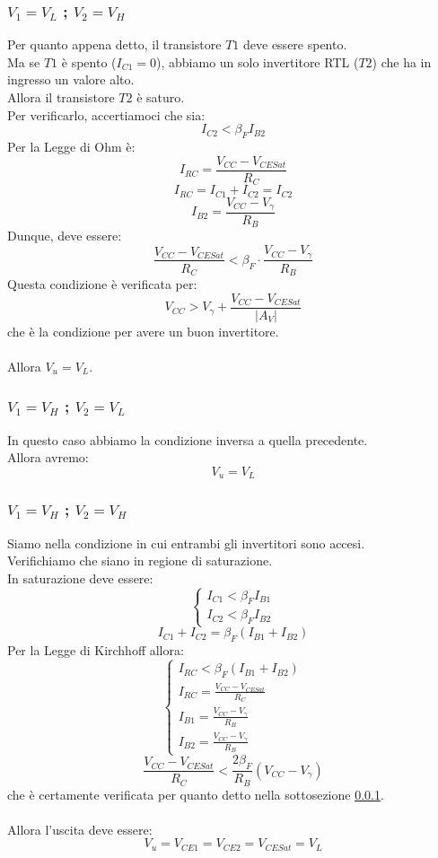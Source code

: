 \documentclass[../main.tex]{subfiles}
\begin{document}
	\subsubsection{$V_1 = V_L$  ;  $V_2 = V_H$}
	\label{subsub:gen-funz+ing-c1}
	Per quanto appena detto, il transistore $T1$ deve essere spento. \\
	Ma se $T1$ è spento ($I_{C1} = 0$), abbiamo un solo invertitore RTL ($T2$) che ha in ingresso un valore alto. \\
	Allora il transistore $T2$ è saturo. \\
	Per verificarlo, accertiamoci che sia:
	$$I_{C2} < \beta_F I_{B2}$$
	Per la Legge di Ohm è:
	$$I_{RC} = \frac{V_{CC} - V_{CESat}}{R_C}$$
	$$I_{RC} = I_{C1} + I_{C2} = I_{C2}$$
	$$I_{B2} = \frac{V_{CC} - V_\gamma}{R_B}$$
	Dunque, deve essere:
	$$\frac{V_{CC} - V_{CESat}}{R_C} < \beta_F \cdot \frac{V_{CC} - V_\gamma}{R_B}$$
	Questa condizione è verificata per:
	$$V_{CC} > V_\gamma + \frac{V_{CC} - V_{CESat}}{|A_V|}$$
	che è la condizione per avere un buon invertitore.\\\\
	Allora $V_u = V_L$.
	\subsubsection{$V_1 = V_H$  ;  $V_2 = V_L$}
	In questo caso abbiamo la condizione inversa a quella precedente. \\
	Allora avremo:
	$$V_u = V_L$$
	\subsubsection{$V_1 = V_H$  ;  $V_2 = V_H$}
	Siamo nella condizione in cui entrambi gli invertitori sono accesi. \\
	Verifichiamo che siano in regione di saturazione. \\
	In saturazione deve essere:
	$$\begin{cases} I_{C1} < \beta_F I_{B1} \\ I_{C2} < \beta_F I_{B2} \end{cases}$$
	$$I_{C1} + I_{C2} = \beta_F (I_{B1} + I_{B2})$$
	Per la Legge di Kirchhoff allora:
	$$\begin{cases} I_{RC} < \beta_F (I_{B1} + I_{B2}) \\ I_{RC} = \frac{V_{CC} - V_{CESat}}{R_C} \\ I_{B1} = \frac{V_{CC} - V_\gamma}{R_B} \\ I_{B2} = \frac{V_{CC} - V_\gamma}{R_B} \end{cases}$$
	$$\frac{V_{CC} - V_{CESat}}{R_C} < \frac{2\beta_F}{R_B} (V_{CC} - V_\gamma)$$
	che è certamente verificata per quanto detto nella sottosezione \ref{subsub:gen-funz+ing-c1}.\\\\
	Allora l’uscita deve essere:
	$$V_u = V_{CE1} = V_{CE2} = V_{CESat} = V_L$$
\end{document}
